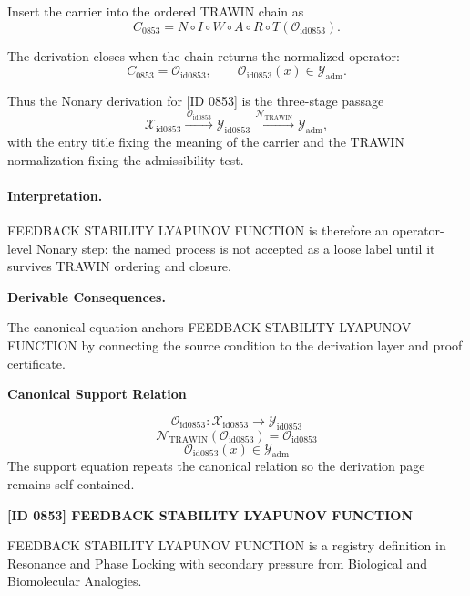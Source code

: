 Insert the carrier into the ordered TRAWIN chain as\[
C_{0853}=N\circ I\circ W\circ A\circ R\circ T(\mathcal{O}_{\mathrm{id0853}}).
\]

The derivation closes when the chain returns the normalized operator:\[
C_{0853}=\mathcal{O}_{\mathrm{id0853}},\qquad \mathcal{O}_{\mathrm{id0853}}(x)\in\mathcal{Y}_{\mathrm{adm}}.
\]

Thus the Nonary derivation for [ID 0853] is the three-stage passage
\[
\mathcal{X}_{\mathrm{id0853}}\xrightarrow{\,\mathcal{O}_{\mathrm{id0853}}\,} \mathcal{Y}_{\mathrm{id0853}}\xrightarrow{\,\mathcal{N}_{\mathrm{TRAWIN}}\,} \mathcal{Y}_{\mathrm{adm}},
\]
with the entry title fixing the meaning of the carrier and the TRAWIN normalization fixing the admissibility test.

\paragraph{Interpretation.} FEEDBACK STABILITY LYAPUNOV FUNCTION is therefore an operator-level Nonary step: the named process is not accepted as a loose label until it survives TRAWIN ordering and closure.

\par\vspace{0.35em}
\noindent\textbf{Derivable Consequences.}\quad
\begingroup
\footnotesize
\raggedright
The canonical equation anchors FEEDBACK STABILITY LYAPUNOV FUNCTION by connecting the source condition to the derivation layer and proof certificate.
\par\endgroup

\noindent\textbf{Canonical Support Relation}\par
\[
\mathcal{O}_{\mathrm{id0853}}:\mathcal{X}_{\mathrm{id0853}}\longrightarrow\mathcal{Y}_{\mathrm{id0853}}
\]
\[
\mathcal{N}_{\mathrm{TRAWIN}}(\mathcal{O}_{\mathrm{id0853}})=\mathcal{O}_{\mathrm{id0853}}
\]
\[
\mathcal{O}_{\mathrm{id0853}}(x)\in\mathcal{Y}_{\mathrm{adm}}
\]
\noindent The support equation repeats the canonical relation so the derivation page remains self-contained.\par

\clearpage
\noindent\textbf{[ID 0853] FEEDBACK STABILITY LYAPUNOV FUNCTION}\par
\vspace{0.35em}
\begingroup\small
{}
FEEDBACK STABILITY LYAPUNOV FUNCTION is a registry definition in Resonance and Phase Locking with secondary pressure from Biological and Biomolecular Analogies.


